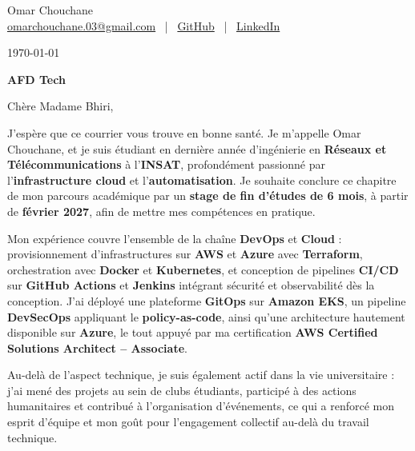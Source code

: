 \documentclass[12pt]{article}
\begin{document}

\begin{center}

{\Huge Omar Chouchane}\\[4pt]

\href{mailto:omarchouchane.03@gmail.com}{omarchouchane.03@gmail.com}
\ | \
\href{https://github.com/OmarChouchane}{GitHub}
\ | \
\href{https://linkedin.com/in/omar-chouchane-87215a201}{LinkedIn}

\end{center}

\vspace{10pt}

\today

\vspace{4pt}

\textbf{AFD Tech}

\vspace{10pt}

Chère Madame Bhiri,

\vspace{5pt}

J'espère que ce courrier vous trouve en bonne santé. Je m'appelle Omar Chouchane, et je suis étudiant en dernière année d'ingénierie en \textbf{Réseaux et Télécommunications} à l'\textbf{INSAT}, profondément passionné par l'\textbf{infrastructure cloud} et l'\textbf{automatisation}. Je souhaite conclure ce chapitre de mon parcours académique par un \textbf{stage de fin d'études de 6 mois}, à partir de \textbf{février 2027}, afin de mettre mes compétences en pratique.

\vspace{5pt}

Mon expérience couvre l'ensemble de la chaîne \textbf{DevOps} et \textbf{Cloud} : provisionnement d'infrastructures sur \textbf{AWS} et \textbf{Azure} avec \textbf{Terraform}, orchestration avec \textbf{Docker} et \textbf{Kubernetes}, et conception de pipelines \textbf{CI/CD} sur \textbf{GitHub Actions} et \textbf{Jenkins} intégrant sécurité et observabilité dès la conception. J'ai déployé une plateforme \textbf{GitOps} sur \textbf{Amazon EKS}, un pipeline \textbf{DevSecOps} appliquant le \textbf{policy-as-code}, ainsi qu'une architecture hautement disponible sur \textbf{Azure}, le tout appuyé par ma certification \textbf{AWS Certified Solutions Architect -- Associate}.

\vspace{5pt}

Au-delà de l'aspect technique, je suis également actif dans la vie universitaire : j'ai mené des projets au sein de clubs étudiants, participé à des actions humanitaires et contribué à l'organisation d'événements, ce qui a renforcé mon esprit d'équipe et mon goût pour l'engagement collectif au-delà du travail technique.
\end{document}
